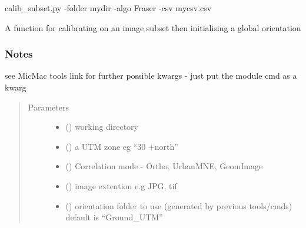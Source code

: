 \documentclass[letterpaper,10pt,english]{sphinxmanual}
\begin{document}
calib\_subset.py -folder mydir -algo Fraser  -csv mycsv.csv

\begin{fulllineitems}
\label{\detokenize{pycmac:utilities.calib_subset}}
A function for calibrating on an image subset then initialising a global
orientation
\subsubsection*{Notes}

see MicMac tools link for further possible kwargs - just put the module cmd as a kwarg
\begin{quote}\begin{description}
\item[{Parameters}] \leavevmode\begin{itemize}
\item {} 
 () \textendash{} working directory

\item {} 
 () \textendash{} a UTM zone eg “30 +north”

\item {} 
 () \textendash{} Correlation mode - Ortho, UrbanMNE, GeomImage

\item {} 
 () \textendash{} image extention e.g JPG, tif

\item {} 
 () \textendash{} orientation folder to use (generated by previous tools/cmds)
default is “Ground\_UTM”

\end{itemize}

\end{description}\end{quote}

\end{fulllineitems}

\end{document}
